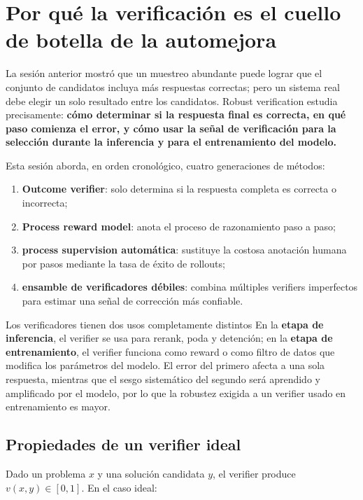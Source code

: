 \section{Por qué la verificación es el cuello de botella de la automejora}

La sesión anterior mostró que un muestreo abundante puede lograr que el conjunto de candidatos incluya más respuestas correctas; pero un sistema real debe elegir un solo resultado entre los candidatos. Robust verification estudia precisamente: \textbf{cómo determinar si la respuesta final es correcta, en qué paso comienza el error, y cómo usar la señal de verificación para la selección durante la inferencia y para el entrenamiento del modelo.}

Esta sesión aborda, en orden cronológico, cuatro generaciones de métodos:

\begin{enumerate}
    \item \textbf{Outcome verifier}: solo determina si la respuesta completa es correcta o incorrecta;
    \item \textbf{Process reward model}: anota el proceso de razonamiento paso a paso;
    \item \textbf{process supervision automática}: sustituye la costosa anotación humana por pasos mediante la tasa de éxito de rollouts;
    \item \textbf{ensamble de verificadores débiles}: combina múltiples verifiers imperfectos para estimar una señal de corrección más confiable.
\end{enumerate}

\begin{importantbox}{Los verificadores tienen dos usos completamente distintos}
En la \textbf{etapa de inferencia}, el verifier se usa para rerank, poda y detención; en la \textbf{etapa de entrenamiento}, el verifier funciona como reward o como filtro de datos que modifica los parámetros del modelo. El error del primero afecta a una sola respuesta, mientras que el sesgo sistemático del segundo será aprendido y amplificado por el modelo, por lo que la robustez exigida a un verifier usado en entrenamiento es mayor.
\end{importantbox}

\subsection{Propiedades de un verifier ideal}

Dado un problema $x$ y una solución candidata $y$, el verifier produce $v(x,y)\in[0,1]$. En el caso ideal:

